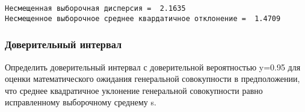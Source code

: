 \documentclass[11pt]{article}
\begin{document}
    \begin{Verbatim}[commandchars=\\\{\}]
Несмещенная выборочная дисперсия =  2.1635
Несмещенное выборочное среднее квардатичное отклонение =  1.4709
    \end{Verbatim}

    \subsubsection{Доверительный
интервал}\label{ux434ux43eux432ux435ux440ux438ux442ux435ux43bux44cux43dux44bux439-ux438ux43dux442ux435ux440ux432ux430ux43b}

Определить доверительный интервал с доверительной вероятностью y=0.95
для оценки математического ожидания генеральной совокупности в
предположении, что среднее квадратичное уклонение генеральной
совокупности равно исправленному выборочному среднему s.
\end{document}
